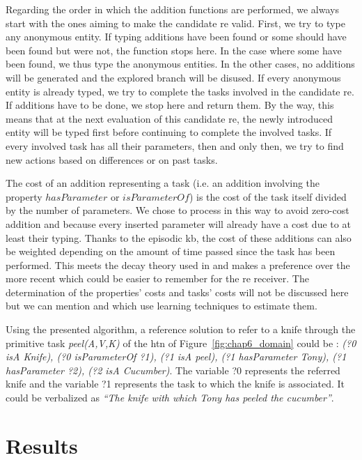 Regarding the order in which the addition functions are performed, we always start with the ones aiming to make the candidate \acrshort{re} valid. First, we try to type any anonymous entity. If typing additions have been found or some should have been found but were not, the function stops here. In the case where some have been found, we thus type the anonymous entities. In the other cases, no additions will be generated and the explored branch will be disused. If every anonymous entity is already typed, we try to complete the tasks involved in the candidate \acrshort{re}. If additions have to be done, we stop here and return them. By the way, this means that at the next evaluation of this candidate \acrshort{re}, the newly introduced entity will be typed first before continuing to complete the involved tasks. If every involved task has all their parameters, then and only then, we try to find new actions based on differences or on past tasks.

The cost of an addition representing a task (i.e. an addition involving the property $hasParameter$ or $isParameterOf$) is the cost of the task itself divided by the number of parameters. We chose to process in this way to avoid zero-cost addition and because every inserted parameter will already have a cost due to at least their typing. Thanks to the episodic \acrshort{kb}, the cost of these additions can also be weighted depending on the amount of time passed since the task has been performed. This meets the decay theory used in \cite{williams_2020_toward} and makes a preference over the more recent which could be easier to remember for the \acrshort{re} receiver. The determination of the properties' costs and tasks' costs will not be discussed here but we can mention \cite{belke_2002_tracking} and \cite{koolen_2012_learning} which use learning techniques to estimate them.

Using the presented algorithm, a reference solution to refer to a knife through the primitive task \textit{peel(A,V,K)} of the \acrshort{htn} of Figure~\ref{fig:chap6_domain} could be : \textit{(?0 isA Knife), (?0 isParameterOf ?1), (?1 isA peel), (?1 hasParameter Tony), (?1 hasParameter ?2), (?2 isA Cucumber)}. The variable ?0 represents the referred knife and the variable ?1 represents the task to which the knife is associated. It could be verbalized as \textit{``The knife with which Tony has peeled the cucumber''}.

\section{Results}

